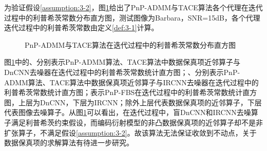 为验证假设\ref{assumption:3-2}，图\ref{fig:3-8}给出了PnP-ADMM与TACE算法各个代理在迭代过程中的利普希茨常数分布直方图，测试图像为Barbara，SNR=15dB，各个代理迭代过程中的利普希茨常数由定义\ref{def:3-1}计算。
\begin{figure}[!htbp]
	\centering
	\caption{PnP-ADMM与TACE算法在迭代过程中的利普希茨常数分布直方图}
	\label{fig:3-8}
\end{figure}

图\ref{fig:3-8}中的、分别表示PnP-ADMM算法、TACE算法中数据保真项近邻算子与DnCNN去噪器在迭代过程中的利普希茨常数统计直方图；、分别表示PnP-ADMM算法、TACE算法中数据保真项近邻算子与IRCNN去噪器在迭代过程中的利普希茨常数统计直方图；表示PnP-FBS在迭代过程中的利普希茨常数统计直方图，上层为DnCNN，下层为IRCNN；除外上层代表数据保真项的近邻算子，下层代表图像去噪算子。从图\ref{fig:3-8}可以看出，在迭代过程中，盲DnCNN和IRCNN去噪算子满足利普希茨约束假设，而编码衍射模型的非凸数据保真项的近邻算子却不是非扩张算子，不满足假设\ref{assumption:3-2}。故该算法无法保证收敛到不动点，关于数据保真项的求解算法有待进一步研究。

